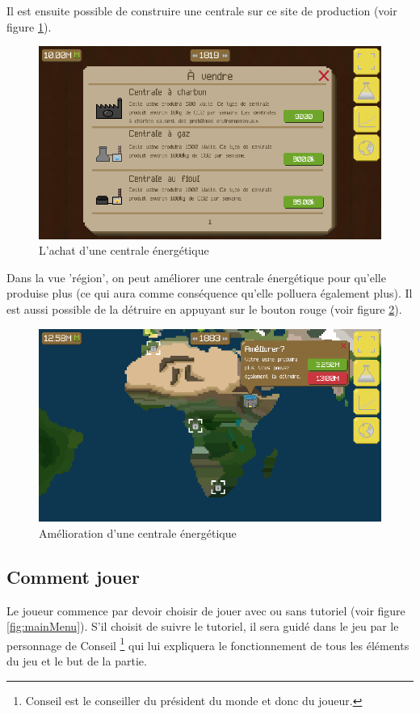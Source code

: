 \documentclass{article}
\begin{document}
        Il est ensuite possible de construire une centrale sur ce site de production (voir figure \ref{fig:buyPlant}).
        \begin{figure}[H]
                \includegraphics[width=\linewidth]{../images/buyPlant}
                \caption{L'achat d'une centrale énergétique}
                \label{fig:buyPlant}
        \end{figure}
        
        Dans la vue 'région', on peut améliorer une centrale énergétique pour qu'elle produise plus (ce qui aura comme conséquence qu'elle polluera également plus). Il est aussi possible de la détruire en appuyant sur le bouton rouge (voir figure \ref{fig:upgradePlant}).
        \begin{figure}[H]
                \includegraphics[width=\linewidth]{../images/upgradePlant}
                \caption{Amélioration d'une centrale énergétique}
                \label{fig:upgradePlant}
        \end{figure}
        
        
        \subsection{Comment jouer}
        Le joueur commence par devoir choisir de jouer avec ou sans tutoriel (voir figure \ref{fig:mainMenu}).
        S'il choisit de suivre le tutoriel, il sera guidé dans le jeu par le personnage de Conseil \footnote{Conseil est le conseiller du président du monde et donc du joueur.} qui lui expliquera le fonctionnement de tous les éléments du jeu et le but de la partie. 
        
\end{document}
